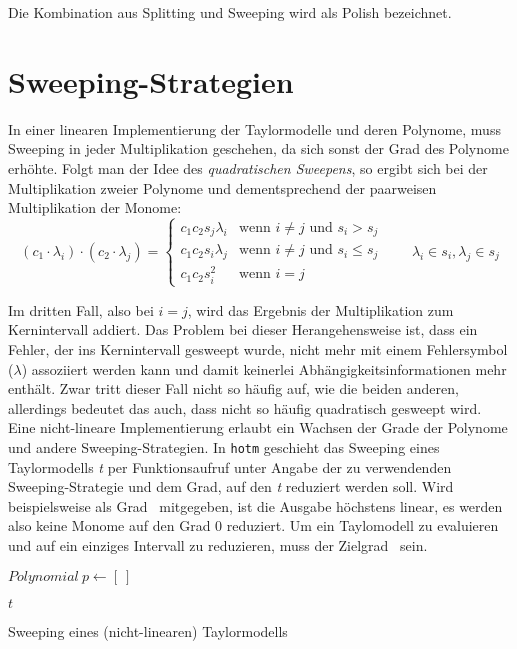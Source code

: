 Die Kombination aus Splitting und Sweeping wird als Polish bezeichnet.





\section{Sweeping-Strategien}
In einer linearen Implementierung der Taylormodelle und deren Polynome, muss Sweeping in jeder Multiplikation geschehen, da sich sonst der Grad des Polynome erhöhte. Folgt man der Idee des \textit{quadratischen Sweepens}, so ergibt sich bei der Multiplikation zweier Polynome und dementsprechend der paarweisen Multiplikation der Monome: 
$$(c_1 \cdot \lambda_i) \cdot (c_2 \cdot \lambda_j) = \begin{cases}

c_1 c_2 s_j \lambda_i & \text{wenn } i \neq j \text{ und } s_i > s_j \\
c_1 c_2 s_i \lambda_j & \text{wenn } i \neq j \text{ und } s_i \leq s_j \\
c_1 c_2 s_i^2 & \text{wenn } i = j
\end{cases} \quad \quad \lambda_i \in s_i, \lambda_j \in s_j $$

Im dritten Fall, also bei $i = j$, wird das Ergebnis der Multiplikation zum Kernintervall addiert. Das Problem bei dieser Herangehensweise ist, dass ein Fehler, der ins Kernintervall gesweept wurde, nicht mehr mit einem Fehlersymbol ($\lambda$) assoziiert werden kann und damit keinerlei Abhängigkeitsinformationen mehr enthält. Zwar tritt dieser Fall nicht so häufig auf, wie die beiden anderen, allerdings bedeutet das auch, dass nicht so häufig quadratisch gesweept wird. Eine nicht-lineare Implementierung erlaubt ein Wachsen der Grade der Polynome und andere Sweeping-Strategien. In \verb+hotm+ geschieht das Sweeping eines Taylormodells \textit{t} per Funktionsaufruf unter Angabe der zu verwendenden Sweeping-Strategie und dem Grad, auf den \textit{t} reduziert werden soll. Wird beispielsweise als Grad \grqq\ mitgegeben, ist die Ausgabe höchstens linear, es werden also keine Monome auf den Grad 0 reduziert. Um ein Taylomodell zu evaluieren und auf ein einziges Intervall zu reduzieren, muss der Zielgrad \grqq\ sein.

\begin{algorithm}
\SetAlgoLined
\label{algo:mult}
$Polynomial\ p \gets [\ ]$\;


\Return $t$

 \caption{Sweeping eines (nicht-linearen) Taylormodells}
\end{algorithm}

